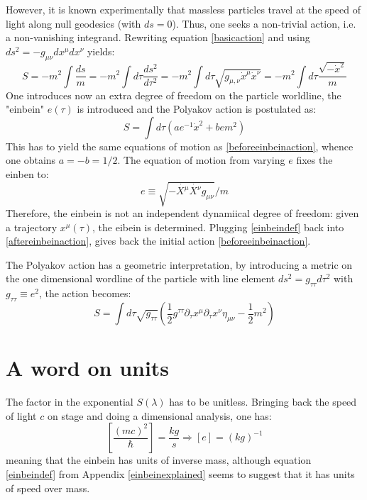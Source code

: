 \documentclass[a4paper,10pt]{article}
\numberwithin{equation}{section}
\begin{document}
\begin{appendices}
However, it is known experimentally that massless particles travel at the speed of light along null geodesics (with $ds = 0$). Thus, one seeks a non-trivial action, i.e. a non-vanishing integrand. Rewriting equation \ref{basicaction} and using $ds^2 = - g_{\mu\nu} dx^{\mu} dx^{\nu}$ yields:
\begin{equation}
S = - m^2 \int \dfrac{ds}{m} = - m^2 \int d\tau \dfrac{ds^2}{d\tau^2} = -m^2 \int d\tau \sqrt{g_{\mu,\nu} \dot{x}^{\mu} \dot{x}^{\nu} } = - m^2 \int d\tau \dfrac{\sqrt{-\dot{x}^2}}{m}
\label{beforeeinbeinaction}
\end{equation}
One introduces now an extra degree of freedom on the particle worldline, the  "einbein" $e(\tau)$ is introduced and the Polyakov action is postulated as:
\begin{equation}
S = \int d\tau \left( a e^{-1} \dot{x}^2 + b e m^2\right) 
\label{aftereinbeinaction}
\end{equation}
This has to yield the same equations of motion as \ref{beforeeinbeinaction}, whence one obtains $a = - b = 1/2$.
The equation of motion from varying $e$ fixes the einben to:
\begin{equation}
e \equiv \sqrt{-\dot{X^\mu}\dot{X^\nu}g_{\mu\nu}}/m
\label{einbeindef}
\end{equation}
Therefore, the einbein is not an independent dynamiical degree of freedom: given a trajectory $x^\mu (\tau)$, the eibein is determined. Plugging \ref{einbeindef} back into \ref{aftereinbeinaction}, gives back the initial action \ref{beforeeinbeinaction}.

The Polyakov action has a geometric interpretation, by introducing a metric on the one dimensional wordline of the particle with line element $ds^2 = g_{\tau\tau} d\tau^2$ with $g_{\tau\tau} \equiv e^2$, the action becomes:
\begin{equation}
    S = \int d\tau \sqrt{g_{\tau\tau}} \left( \frac{1}{2} g^{\tau\tau} \partial_\tau x^\mu \partial_\tau x^\nu \eta_{\mu\nu} - \frac{1}{2}m^2\right)
\end{equation}

\section{A word on units}
The factor in the exponential $ S(\lambda)$ has to be unitless. Bringing back the speed of light $c$ on stage and doing a dimensional analysis, one has:
\begin{equation}
   \left[ \frac{(mc)^2}{\hbar}\right] =  \frac{kg}{s} \Rightarrow \left[e\right] = (kg)^{-1}
\end{equation} 
meaning that the einbein has units of inverse mass, although equation \ref{einbeindef} from Appendix \ref{einbeinexplained} seems to suggest that it has units of speed over mass. 


\end{appendices}
\end{document}

